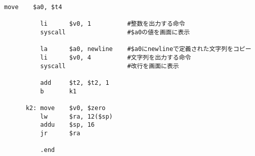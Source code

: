 \documentclass{jsarticle}
\begin{document}
\begin{description}
\begin{lstlisting}[caption=課題1のソースコード, label=prob1]
          move    $a0, $t4

          li      $v0, 1          #整数を出力する命令
          syscall                 #$a0の値を画面に表示

          la      $a0, newline    #$a0にnewlineで定義された文字列をコピー
          li      $v0, 4          #文字列を出力する命令
          syscall                 #改行を画面に表示

          add     $t2, $t2, 1
          b       k1

      k2: move    $v0, $zero
          lw      $ra, 12($sp)
          addu    $sp, 16
          jr      $ra

          .end
      \end{lstlisting}

  \end{description}
\end{document}

